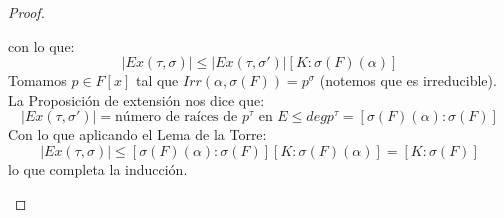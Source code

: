 \begin{prop}
\begin{proof}
\begin{itemize}
                con lo que:
                \begin{equation*}
                    |Ex(\tau,\sigma)| \leq |Ex(\tau,\sigma')| [K:\sigma(F)(\alpha)]
                \end{equation*}
                Tomamos $p\in F[x]$ tal que $Irr(\alpha,\sigma(F)) = p^\sigma$ (notemos que es irreducible). La Proposición de extensión nos dice que:
                \begin{equation*}
                    |Ex(\tau,\sigma')| = \text{número de raíces de\ } p^\tau \text{\ en\ } E \leq deg p^\tau = [\sigma(F)(\alpha):\sigma(F)]
                \end{equation*}
                Con lo que aplicando el Lema de la Torre:
                \begin{equation*}
                    |Ex(\tau,\sigma)| \leq [\sigma(F)(\alpha):\sigma(F)][K:\sigma(F)(\alpha)] = [K:\sigma(F)]
                \end{equation*}
                lo que completa la inducción.
        \end{itemize}
    \end{proof}
\end{prop}


